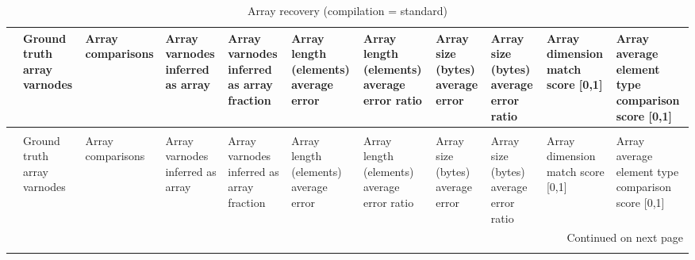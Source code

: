 \begin{longtable}{lp{1.8cm}p{1.8cm}p{1.8cm}p{1.8cm}p{1.8cm}p{1.8cm}p{1.8cm}p{1.8cm}p{1.8cm}p{1.8cm}}
\caption{Array recovery (compilation = standard)}
\label{table:array-comparisons-O0}\\
\toprule
{} &  Ground truth array varnodes &  Array comparisons &  Array varnodes inferred as array &  Array varnodes inferred as array fraction &  Array length (elements) average error &  Array length (elements) average error ratio &  Array size (bytes) average error &  Array size (bytes) average error ratio &  Array dimension match score [0,1] &  Array average element type comparison score [0,1] \\
\midrule
\endfirsthead
\caption[]{Array recovery (compilation = standard)} \\
\toprule
{} &  Ground truth array varnodes &  Array comparisons &  Array varnodes inferred as array &  Array varnodes inferred as array fraction &  Array length (elements) average error &  Array length (elements) average error ratio &  Array size (bytes) average error &  Array size (bytes) average error ratio &  Array dimension match score [0,1] &  Array average element type comparison score [0,1] \\
\midrule
\endhead
\midrule
\multicolumn{11}{r}{{Continued on next page}} \\
\midrule
\endfoot


\end{longtable}
